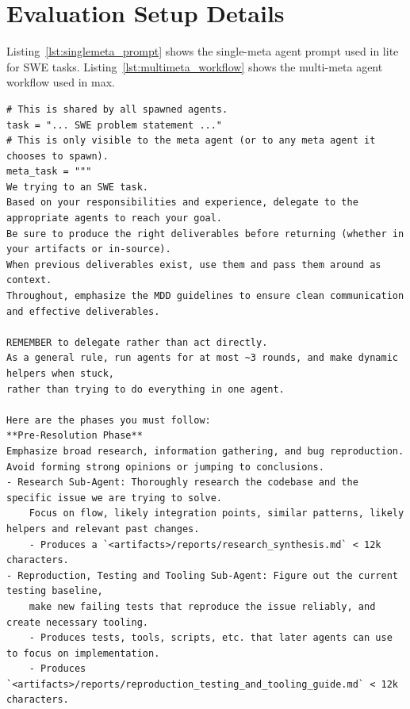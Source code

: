 
\section{Evaluation Setup Details}
\label{sec:app_eval_setup}
\label{sec:app_agent_configs}

Listing~\ref{lst:singlemeta_prompt} shows the single-meta agent prompt used in \sysname lite for SWE tasks.
Listing~\ref{lst:multimeta_workflow} shows the multi-meta agent workflow used in \sysname max.

\begin{listing}[H]
{\tiny
\begin{lstlisting}[rulecolor=\color{accentShell}]
# This is shared by all spawned agents.
task = "... SWE problem statement ..."
# This is only visible to the meta agent (or to any meta agent it chooses to spawn).
meta_task = """
We trying to an SWE task.
Based on your responsibilities and experience, delegate to the appropriate agents to reach your goal.
Be sure to produce the right deliverables before returning (whether in your artifacts or in-source).
When previous deliverables exist, use them and pass them around as context.
Throughout, emphasize the MDD guidelines to ensure clean communication and effective deliverables.

REMEMBER to delegate rather than act directly.
As a general rule, run agents for at most ~3 rounds, and make dynamic helpers when stuck,
rather than trying to do everything in one agent.

Here are the phases you must follow:
**Pre-Resolution Phase**
Emphasize broad research, information gathering, and bug reproduction.
Avoid forming strong opinions or jumping to conclusions.
- Research Sub-Agent: Thoroughly research the codebase and the specific issue we are trying to solve.
    Focus on flow, likely integration points, similar patterns, likely helpers and relevant past changes.
    - Produces a `<artifacts>/reports/research_synthesis.md` < 12k characters.
- Reproduction, Testing and Tooling Sub-Agent: Figure out the current testing baseline,
    make new failing tests that reproduce the issue reliably, and create necessary tooling.
    - Produces tests, tools, scripts, etc. that later agents can use to focus on implementation.
    - Produces `<artifacts>/reports/reproduction_testing_and_tooling_guide.md` < 12k characters.


\end{lstlisting}}
\end{listing}
